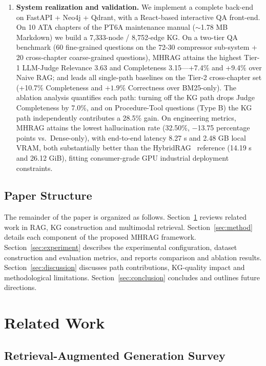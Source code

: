 \documentclass[applsci,article,submit,pdftex,moreauthors]{Definitions/mdpi}
\begin{document}
\begin{enumerate}
\item \textbf{System realization and validation.} We implement a complete back-end on FastAPI + Neo4j + Qdrant, with a React-based interactive QA front-end. On 10 ATA chapters of the PT6A maintenance manual ($\sim$1.78 MB Markdown) we build a 7{,}333-node / 8{,}752-edge KG. On a two-tier QA benchmark (60 fine-grained questions on the 72-30 compressor sub-system + 20 cross-chapter coarse-grained questions), MHRAG attains the highest Tier-1 LLM-Judge Relevance 3.63 and Completeness 3.15---{+}7.4\% and {+}9.4\% over Naive RAG; and leads all single-path baselines on the Tier-2 cross-chapter set ({+}10.7\% Completeness and ${+}1.9\%$ Correctness over BM25-only). The ablation analysis quantifies each path: turning off the KG path drops Judge Completeness by 7.0\%, and on Procedure-Tool questions (Type B) the KG path independently contributes a 28.5\% gain. On engineering metrics, MHRAG attains the lowest hallucination rate (32.50\%, $-$13.75 percentage points vs.\ Dense-only), with end-to-end latency 8.27 s and 2.48 GB local VRAM, both substantially better than the HybridRAG~\citep{shen2025hybridrag} reference (14.19 s and 26.12 GiB), fitting consumer-grade GPU industrial deployment constraints.
\end{enumerate}

\subsection{Paper Structure}
\label{sec:structure}

The remainder of the paper is organized as follows. Section~\ref{sec:related} reviews related work in RAG, KG construction and multimodal retrieval. Section~\ref{sec:method} details each component of the proposed MHRAG framework. Section~\ref{sec:experiment} describes the experimental configuration, dataset construction and evaluation metrics, and reports comparison and ablation results. Section~\ref{sec:discussion} discusses path contributions, KG-quality impact and methodological limitations. Section~\ref{sec:conclusion} concludes and outlines future directions.

\section{Related Work}
\label{sec:related}

\subsection{Retrieval-Augmented Generation Survey}
\label{sec:related-rag}
\end{document}
